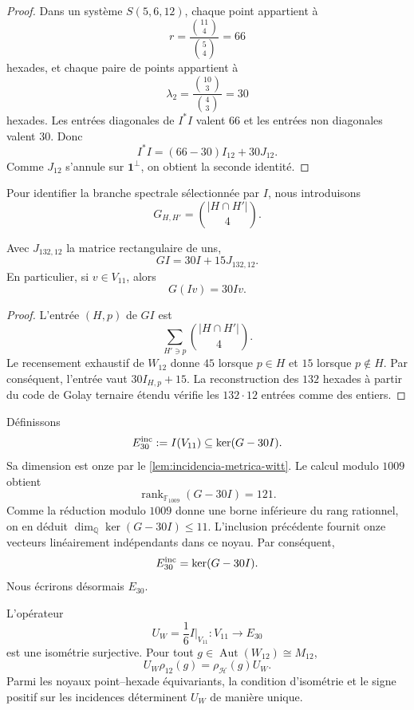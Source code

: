 \begin{proof}
Dans un système \(S(5,6,12)\), chaque point appartient à
\[
 r=\frac{\binom{11}{4}}{\binom54}=66
\]
hexades, et chaque paire de points appartient à
\[
 \lambda_2=\frac{\binom{10}{3}}{\binom43}=30
\]
hexades. Les entrées diagonales de \(I^*I\) valent \(66\) et les entrées non
diagonales valent \(30\). Donc
\[
 I^*I=(66-30)I_{12}+30J_{12}.
\]
Comme \(J_{12}\) s'annule sur \(\mathbf1^\perp\), on obtient la seconde
identité.
\end{proof}

Pour identifier la branche spectrale sélectionnée par \(I\), nous introduisons
\[
 G_{H,H'}=\binom{|H\cap H'|}{4}.
\]

\begin{lemma}
\label{lem:incidencia-espectral-witt}
Avec \(J_{132,12}\) la matrice rectangulaire de uns,
\[
 \boxed{GI=30I+15J_{132,12}.}
\]
En particulier, si \(v\in V_{11}\), alors
\[
 G(Iv)=30Iv.
\]
\end{lemma}

\begin{proof}
L'entrée \((H,p)\) de \(GI\) est
\[
 \sum_{H'\ni p}\binom{|H\cap H'|}{4}.
\]
Le recensement exhaustif de \(W_{12}\) donne \(45\) lorsque \(p\in H\) et \(15\)
lorsque \(p\notin H\). Par conséquent, l'entrée vaut
\(30I_{H,p}+15\). La reconstruction des \(132\) hexades à partir du code
de Golay ternaire étendu vérifie les \(132\cdot12\) entrées comme des
entiers.
\end{proof}

Définissons
\[
 E_{30}^{\rm inc}:=I(V_{11})\subseteq\ker(G-30I).
\]
Sa dimension est onze par le \cref{lem:incidencia-metrica-witt}. Le calcul
modulo \(1009\) obtient
\[
 \operatorname{rank}_{\mathbb F_{1009}}(G-30I)=121.
\]
Comme la réduction modulo \(1009\) donne une borne inférieure du rang
rationnel, on en déduit
\(\dim_{\mathbb Q}\ker(G-30I)\le11\). L'inclusion précédente fournit
onze vecteurs linéairement indépendants dans ce noyau. Par conséquent,
\[
 E_{30}^{\rm inc}=\ker(G-30I).
\]
Nous écrirons désormais \(E_{30}\).

\begin{theorem}
\label{thm:entrelazador-dodecafase-witt}
L'opérateur
\[
 \boxed{
 U_W=\frac16 I\big|_{V_{11}}:V_{11}\longrightarrow E_{30}
 }
\]
est une isométrie surjective. Pour tout
\(g\in\operatorname{Aut}(W_{12})\cong M_{12}\),
\[
 U_W\rho_{12}(g)=\rho_{\mathcal H}(g)U_W.
\]
Parmi les noyaux point--hexade équivariants, la condition d'isométrie et
le signe positif sur les incidences déterminent \(U_W\) de manière unique.
\end{theorem}

